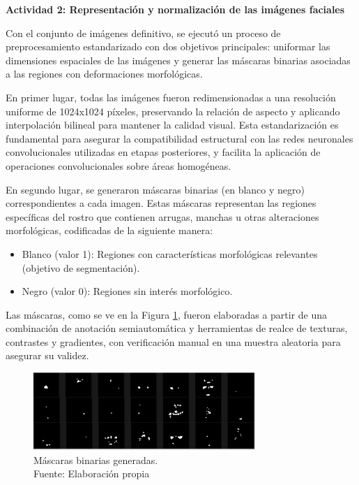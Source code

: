 \textbf{Actividad 2: Representación y normalización de las imágenes faciales}

Con el conjunto de imágenes definitivo, se ejecutó un proceso de preprocesamiento estandarizado con dos objetivos principales: uniformar las dimensiones espaciales de las imágenes y generar las máscaras binarias asociadas a las regiones con deformaciones morfológicas.

En primer lugar, todas las imágenes fueron redimensionadas a una resolución uniforme de 1024x1024 píxeles, preservando la relación de aspecto y aplicando interpolación bilineal para mantener la calidad visual. Esta estandarización es fundamental para asegurar la compatibilidad estructural con las redes neuronales convolucionales utilizadas en etapas posteriores, y facilita la aplicación de operaciones convolucionales sobre áreas homogéneas.

En segundo lugar, se generaron máscaras binarias (en blanco y negro) correspondientes a cada imagen. Estas máscaras representan las regiones específicas del rostro que contienen arrugas, manchas u otras alteraciones morfológicas, codificadas de la siguiente manera:

\begin{itemize}
    \item Blanco (valor 1): Regiones con características morfológicas relevantes (objetivo de segmentación).   
    \item Negro (valor 0): Regiones sin interés morfológico.
\end{itemize} 

Las máscaras, como se ve en la Figura \ref{4:fig2}, fueron elaboradas a partir de una combinación de anotación semiautomática y herramientas de realce de texturas, contrastes y gradientes, con verificación manual en una muestra aleatoria para asegurar su validez.

\begin{figure}[h]
	\begin{center}
		\includegraphics[width=0.75\textwidth]{4/figures/mascaras.png}
		\caption[Máscaras binarias generadas]{Máscaras binarias generadas.\\
		Fuente: Elaboración propia}
		\label{4:fig2}
	\end{center}
\end{figure}

